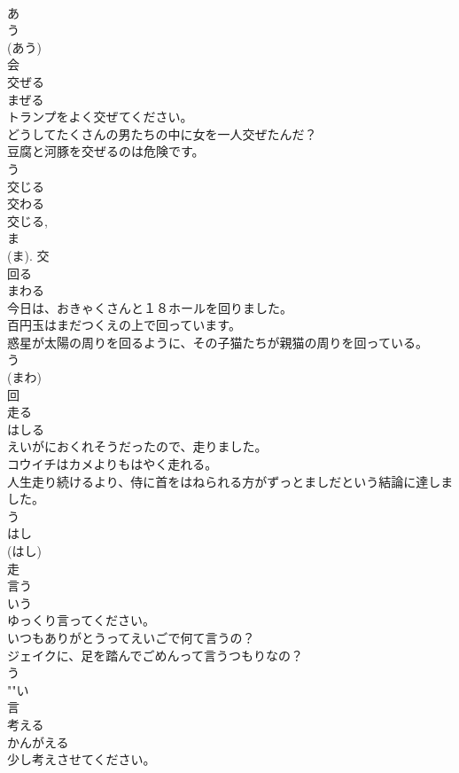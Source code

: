 \documentclass[8pt]{extreport}
\begin{document}
\begin{CJK}{UTF8}{min}
\\	あ 
\\	う 
\\	(あう) 
\\	会	
\\	交ぜる	
\\	まぜる	
\\	トランプをよく交ぜてください。	
\\	どうしてたくさんの男たちの中に女を一人交ぜたんだ？	
\\	豆腐と河豚を交ぜるのは危険です。	
\\	う 
\\	交じる 
\\	交わる 
\\	交じる, 
\\	ま 
\\	(ま).	交	
\\	回る	
\\	まわる	
\\	今日は、おきゃくさんと１８ホールを回りました。	
\\	百円玉はまだつくえの上で回っています。	
\\	惑星が太陽の周りを回るように、その子猫たちが親猫の周りを回っている。	
\\	う 
\\	(まわ)
\\	回	
\\	走る	
\\	はしる	
\\	えいがにおくれそうだったので、走りました。	
\\	コウイチはカメよりもはやく走れる。	
\\	人生走り続けるより、侍に首をはねられる方がずっとましだという結論に達しました。	
\\	う 
\\	はし 
\\	(はし) 
\\	走	
\\	言う	
\\	いう	
\\	ゆっくり言ってください。	
\\	いつもありがとうってえいごで何て言うの？	
\\	ジェイクに、足を踏んでごめんって言うつもりなの？	
\\	う 
\\	""い
\\	言	
\\	考える	
\\	かんがえる	
\\	少し考えさせてください。	

\end{CJK}
\end{document}

